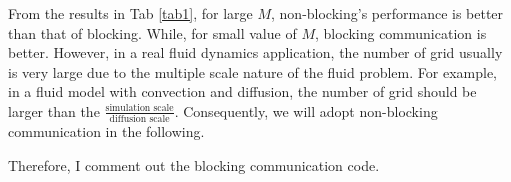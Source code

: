 From the results in Tab \ref{tab1}, for large $M$, non-blocking's performance is better than that of blocking. While, for
small value of $M$, blocking communication is better. However, in a real fluid dynamics application, the number of 
grid usually is very large due to the multiple scale nature of the fluid problem. For example, in a fluid model with
convection and diffusion, the number of grid should be larger than the $\frac{\textrm{simulation scale}}{\textrm{diffusion scale}}$.
Consequently, we will adopt non-blocking communication in the following.

Therefore, I comment out the blocking communication code.
